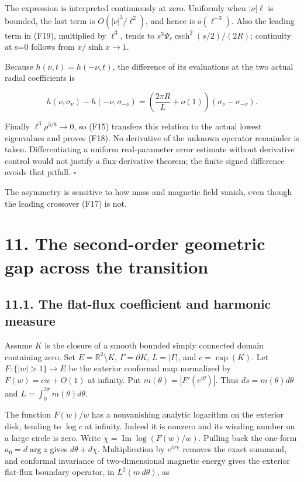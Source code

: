 \documentclass[11pt]{article}
\begin{document}
The expression is interpreted continuously at zero. Uniformly when
\(|\nu|\ell\) is bounded, the last term is \(O(|\nu|^3/\ell^2)\), and
hence is \(o(\ell^{-3})\). Also the leading term in (F19), multiplied by
\(\ell^3\), tends to \(s^3\Psi_r\operatorname{csch}^2(s/2)/(2R)\);
continuity at s=0 follows from \(x/\sinh x\to1\).

Because \(h(\nu,t)=h(-\nu,t)\), the difference of its evaluations at the
two actual radial coefficients is

\[h(\nu,\sigma_\nu)-h(-\nu,\sigma_{-\nu})
=\left(\frac{2\pi R}{L}+o(1)\right)(\sigma_\nu-\sigma_{-\nu}).\]

Finally \(\ell^3\rho^{3/8}\to0\), so (F15) transfers this relation to
the actual lowest eigenvalues and proves (F18). No derivative of the
unknown operator remainder is taken. Differentiating a uniform
real-parameter error estimate without derivative control would not
justify a flux-derivative theorem; the finite signed difference avoids
that pitfall. \(\square\)

The asymmetry is sensitive to how mass and magnetic field vanish, even
though the leading crossover (F17) is not.

\section{11. The second-order geometric gap across the
transition}\label{the-second-order-geometric-gap-across-the-transition}

\subsection{11.1. The flat-flux coefficient and harmonic
measure}\label{the-flat-flux-coefficient-and-harmonic-measure}

Assume \(K\) is the closure of a smooth bounded simply connected domain
containing zero. Set \(E=\mathbb R^2\setminus K\),
\(\Gamma=\partial K\), \(L=|\Gamma|\), and \(c=\operatorname{cap}(K)\).
Let \(F:\{|w|>1\}\to E\) be the exterior conformal map normalized by
\(F(w)=cw+O(1)\) at infinity. Put \(m(\theta)=|F'(e^{i\theta})|\). Thus
\(ds=m(\theta)d\theta\) and \(L=\int_0^{2\pi}m(\theta)d\theta\).

The function \(F(w)/w\) has a nonvanishing analytic logarithm on the
exterior disk, tending to \(\log c\) at infinity. Indeed it is nonzero
and its winding number on a large circle is zero. Write
\(\chi=\operatorname{Im}\log(F(w)/w)\). Pulling back the one-form
\(a_0=d\arg z\) gives \(d\theta+d\chi\). Multiplication by
\(e^{i\nu\chi}\) removes the exact summand, and conformal invariance of
two-dimensional magnetic energy gives the exterior flat-flux boundary
operator, in \(L^2(m\,d\theta)\), as
\end{document}
